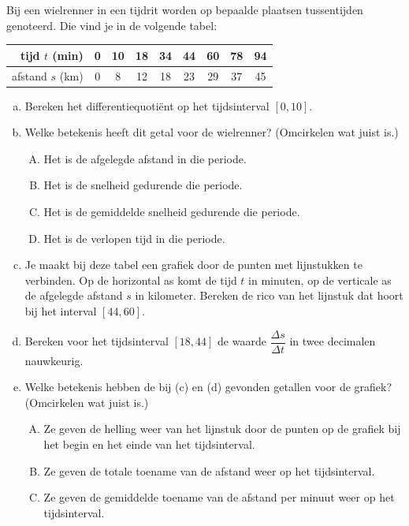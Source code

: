 \documentclass[12pt]{article}
\begin{document}
\begin{oefening}
  Bij een wielrenner in een tijdrit worden op bepaalde plaatsen tussentijden genoteerd. Die vind je in de volgende tabel:

  \begin{center}
    \begin{tabular}{r|cccccccc}
      tijd $t$ (min) & 0 & 10 & 18 & 34 & 44 & 60 & 78 & 94\\
      \hline
      afstand $s$ (km) & 0 & 8 & 12 & 18 & 23 & 29 & 37 & 45\\
    \end{tabular}
  \end{center}

  \begin{enumerate}[(a)]
  \item Bereken het differentiequotiënt op het tijdsinterval $[0,10]$.
  \item Welke betekenis heeft dit getal voor de wielrenner? (Omcirkelen wat juist is.)
    \begin{enumerate}[(A)]
    \item Het is de afgelegde afstand in die periode.
    \item Het is de snelheid gedurende die periode.
    \item Het is de gemiddelde snelheid gedurende die periode.
    \item Het is de verlopen tijd in die periode.
    \end{enumerate}
  \item Je maakt bij deze tabel een grafiek door de punten met lijnstukken te verbinden. Op de horizontal as komt de tijd $t$ in minuten, op de verticale as de afgelegde afstand $s$ in kilometer. Bereken de rico van het lijnstuk dat hoort bij het interval $[44,60]$.
  \item Bereken voor het tijdsinterval $[18,44]$ de waarde $\dfrac{\Delta s}{\Delta t}$ in twee decimalen nauwkeurig.
  \item Welke betekenis hebben de bij (c) en (d) gevonden getallen voor de grafiek? (Omcirkelen wat juist is.)
    \begin{enumerate}[(A)]
    \item Ze geven de helling weer van het lijnstuk door de punten op de grafiek bij het begin en het einde van het tijdsinterval.
    \item Ze geven de totale toename van de afstand weer op het tijdsinterval.
    \item Ze geven de gemiddelde toename van de afstand per minuut weer op het tijdsinterval.

\end{enumerate}
\end{enumerate}
\end{oefening}
\end{document}
